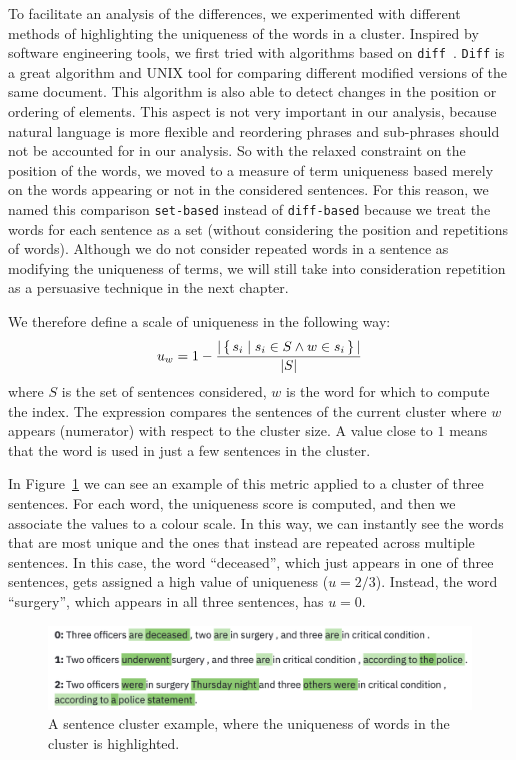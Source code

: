 To facilitate an analysis of the differences, we experimented with different methods of highlighting the uniqueness of the words in a cluster.
Inspired by software engineering tools, we first tried with algorithms based on \texttt{diff}~\citep{myers1986ano}.
\texttt{Diff} is a great algorithm and UNIX tool for comparing different modified versions of the same document.
This algorithm is also able to detect changes in the position or ordering of elements. This aspect is not very important in our analysis, because natural language is more flexible and reordering phrases and sub-phrases should not be accounted for in our analysis. So with the relaxed constraint on the position of the words, we moved to a measure of term uniqueness based merely on the words appearing or not in the considered sentences. For this reason, we named this comparison \texttt{set-based} instead of \texttt{diff-based} because we treat the words for each sentence as a set (without considering the position and repetitions of words).
Although we do not consider repeated words in a sentence as modifying the uniqueness of terms, we will still take into consideration repetition as a persuasive technique in the next chapter.

We therefore define a scale of uniqueness in the following way:
$$u_w = 1 - \frac{|\set{s_i | s_i \in S \land w \in s_i}|}{|S|}$$
where $S$ is the set of sentences considered, $w$ is the word for which to compute the index. The expression compares the sentences of the current cluster where $w$ appears (numerator) with respect to the cluster size.
A value close to $1$ means that the word is used in just a few sentences in the cluster.

In Figure~\ref{fig:words_uniqueness} we can see an example of this metric applied to a cluster of three sentences.
For each word, the uniqueness score is computed, and then we associate the values to a colour scale.
In this way, we can instantly see the words that are most unique and the ones that instead are repeated across multiple sentences.
In this case, the word ``deceased'', which just appears in one of three sentences, gets assigned a high value of uniqueness ($u = 2/3$). Instead, the word ``surgery'', which appears in all three sentences, has $u = 0$.

\begin{figure}[!htb]
    \centering
    \includegraphics[width=\textwidth]{figures/words_uniqueness.png}
    \caption{A sentence cluster example, where the uniqueness of words in the cluster is highlighted.}
    \label{fig:words_uniqueness}
\end{figure}



